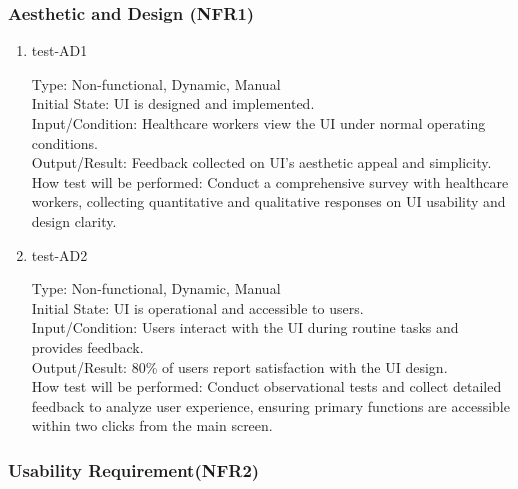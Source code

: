 \documentclass[12pt, titlepage]{article}
\begin{document}
\subsubsection{Aesthetic and Design (NFR1)} \label{section:4.2.1}

\begin{enumerate}
    \item{test-AD1\\} \label{test-AD1}
    
    Type: Non-functional, Dynamic, Manual\\
    
    Initial State: UI is designed and implemented.\\
    
    Input/Condition: Healthcare workers view the UI under normal operating conditions.\\
    
    Output/Result: Feedback collected on UI’s aesthetic appeal and simplicity.\\
    
    How test will be performed: Conduct a comprehensive survey with healthcare workers, collecting quantitative and qualitative responses on UI usability and design clarity.

    \item{test-AD2\\} \label{test-AD2}
    
    Type: Non-functional, Dynamic, Manual\\
    
    Initial State: UI is operational and accessible to users.\\
    
    Input/Condition: Users interact with the UI during routine tasks and provides feedback.\\
    
    Output/Result: 80\% of users report satisfaction with the UI design.\\
    
    How test will be performed: Conduct observational tests and collect detailed feedback to analyze user experience, ensuring primary functions are accessible within two clicks from the main screen. 
\end{enumerate}

\subsubsection{Usability Requirement(NFR2)} \label{section:4.2.2}
\end{document}
